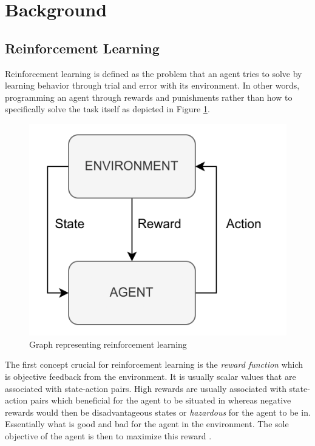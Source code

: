 \section{Background}

\subsection{Reinforcement Learning}

Reinforcement learning is defined as the problem that an agent tries to solve by learning behavior through trial and error with its environment. In other words, programming an agent through rewards and punishments rather than how to specifically solve the task itself \cite{kaelbling1996reinforcement} as depicted in Figure \ref{figRL}.
\begin{figure}[H]
    \centering
    \includegraphics [scale = 0.2]{Images/RL_graph.png}
    \caption{Graph representing reinforcement learning}
    \label{figRL}
\end{figure}
The first concept crucial for reinforcement learning is the \textit{reward function} which is objective feedback from the environment. It is usually scalar values that are associated with state-action pairs. High rewards are usually associated with state-action pairs which beneficial for the agent to be situated in whereas negative rewards would then be disadvantageous states or \textit{hazardous} for the agent to be in. Essentially what is good and bad for the agent in the environment. The sole objective of the agent is then to maximize this reward \cite{sutton1999reinforcement}.

